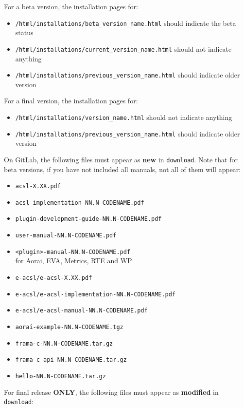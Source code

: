 For a beta version, the installation pages for:
\begin{itemize}
\item \texttt{/html/installations/beta\_version\_name.html} should indicate the beta status
\item \texttt{/html/installations/current\_version\_name.html} should not indicate anything
\item \texttt{/html/installations/previous\_version\_name.html} should indicate older version
\end{itemize}

For a final version, the installation pages for:
\begin{itemize}
\item \texttt{/html/installations/version\_name.html} should not indicate anything
\item \texttt{/html/installations/previous\_version\_name.html} should indicate older version
\end{itemize}

On GitLab, the following files must appear as \textbf{new} in \texttt{download}.
Note that for beta versions, if you have not included all manuals, not all of
them will appear:

\begin{itemize}
  \item \texttt{acsl-X.XX.pdf}
  \item \texttt{acsl-implementation-NN.N-CODENAME.pdf}
  \item \texttt{plugin-development-guide-NN.N-CODENAME.pdf}
  \item \texttt{user-manual-NN.N-CODENAME.pdf}
  \item \texttt{<plugin>-manual-NN.N-CODENAME.pdf}\\
        for Aorai, EVA, Metrics, RTE and WP
  \item \texttt{e-acsl/e-acsl-X.XX.pdf}
  \item \texttt{e-acsl/e-acsl-implementation-NN.N-CODENAME.pdf}
  \item \texttt{e-acsl/e-acsl-manual-NN.N-CODENAME.pdf}
  \item \texttt{aorai-example-NN.N-CODENAME.tgz}
  \item \texttt{frama-c-NN.N-CODENAME.tar.gz}
  \item \texttt{frama-c-api-NN.N-CODENAME.tar.gz}
  \item \texttt{hello-NN.N-CODENAME.tar.gz}
\end{itemize}

For final release \textbf{ONLY}, the following files must appear as \textbf{modified} in \texttt{download}:

